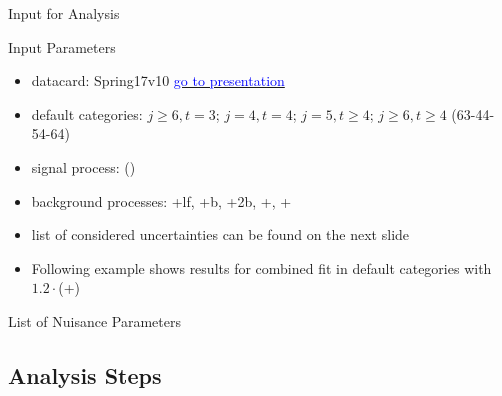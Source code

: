 \begin{frame}{Input for Analysis}

\begin{block}{Input Parameters}
\begin{itemize}
\item datacard: Spring17v10 \href{https://indico.cern.ch/event/628833/contributions/2624507/attachments/1474840/2283855/KITv10p2.pdf}{\textcolor{blue}{go to presentation}}
\item default categories: $j\geq 6, t=3$; $j=4, t=4$; $j=5, t\geq 4$; $j\geq 6, t\geq 4$ (63-44-54-64)
\item signal process: \ttbarH(\bbbar)
\item background processes: \ttbar+lf, \ttbar+b, \ttbar+2b, \ttbar+\bbbar, \ttbar + \ccbar
\item list of considered uncertainties can be found on the next slide
\end{itemize}
\end{block}
\begin{itemize}
\item Following example shows results for combined fit in default categories with $\num[round-precision=1]{1.2}\cdot$(\ttbar+\bbbar)
\end{itemize}

\end{frame}

\begin{frame}{List of Nuisance Parameters}


\end{frame}

\subsection{Analysis Steps}

